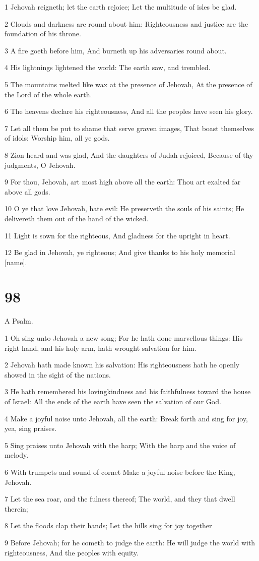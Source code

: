 \par 1 Jehovah reigneth; let the earth rejoice; Let the multitude of isles be glad.
\par 2 Clouds and darkness are round about him: Righteousness and justice are the foundation of his throne.
\par 3 A fire goeth before him, And burneth up his adversaries round about.
\par 4 His lightnings lightened the world: The earth saw, and trembled.
\par 5 The mountains melted like wax at the presence of Jehovah, At the presence of the Lord of the whole earth.
\par 6 The heavens declare his righteousness, And all the peoples have seen his glory.
\par 7 Let all them be put to shame that serve graven images, That boast themselves of idols: Worship him, all ye gods.
\par 8 Zion heard and was glad, And the daughters of Judah rejoiced, Because of thy judgments, O Jehovah.
\par 9 For thou, Jehovah, art most high above all the earth: Thou art exalted far above all gods.
\par 10 O ye that love Jehovah, hate evil: He preserveth the souls of his saints; He delivereth them out of the hand of the wicked.
\par 11 Light is sown for the righteous, And gladness for the upright in heart.
\par 12 Be glad in Jehovah, ye righteous; And give thanks to his holy memorial [name].

\chapter{98}

\par A Psalm.

\par 1 Oh sing unto Jehovah a new song; For he hath done marvellous things: His right hand, and his holy arm, hath wrought salvation for him.
\par 2 Jehovah hath made known his salvation: His righteousness hath he openly showed in the sight of the nations.
\par 3 He hath remembered his lovingkindness and his faithfulness toward the house of Israel: All the ends of the earth have seen the salvation of our God.
\par 4 Make a joyful noise unto Jehovah, all the earth: Break forth and sing for joy, yea, sing praises.
\par 5 Sing praises unto Jehovah with the harp; With the harp and the voice of melody.
\par 6 With trumpets and sound of cornet Make a joyful noise before the King, Jehovah.
\par 7 Let the sea roar, and the fulness thereof; The world, and they that dwell therein;
\par 8 Let the floods clap their hands; Let the hills sing for joy together
\par 9 Before Jehovah; for he cometh to judge the earth: He will judge the world with righteousness, And the peoples with equity.

